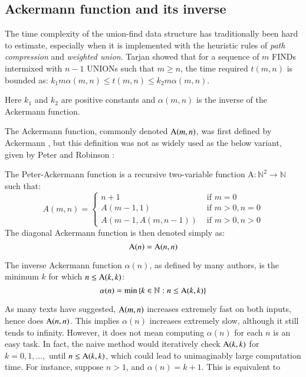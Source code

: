 \subsection{Ackermann function and its inverse}

The time complexity of the union-find data structure has traditionally
been hard to estimate, especially when it is implemented with the 
heuristic rules of \emph{path compression} and \emph{weighted union}. 
Tarjan \cite{tarjan} showed that for a sequence of $m$ FINDs intermixed with $n-1$ UNIONs 
such that $m \geq n$, the time required $t(m,n)$ is bounded
as: $k_{1}m\alpha(m,n) \leq t(m,n) \leq k_{2}m\alpha(m,n)$.

Here $k_{1}$ and $k_{2}$ are positive constants and $\alpha(m,n)$ is 
the inverse of the Ackermann function.

The Ackermann function, commonly denoted $\text{A}(m, n)$, was first defined by Ackermann \cite{ackermann}, but this definition was not as widely used as the below variant, given by Peter and Robinson \cite{peter-ackermann}:

\begin{defn} \label{defn: ack}
The Peter-Ackermann function is a recursive two-variable function $\text{A} : \mathbb{N}^2 \to \mathbb{N}$ such that:
\begin{equation}
A(m, n) = \begin{cases}
n + 1 & \text{ if } m = 0 \\
A(m-1, 1) & \text{ if } m > 0, n = 0 \\
A(m-1, A(m, n-1)) & \text{ if } m > 0, n > 0
\end{cases}
\end{equation}
The diagonal Ackermann function is then denoted simply as:
\begin{equation}
\text{A}(n) = \text{A}(n, n)
\end{equation}
\end{defn}


\begin{defn} \label{defn: inv_ack}
The inverse Ackermann function $\alpha(n)$, as defined by many authors, is the minimum $k$ for which $n \le \text{A}(k, k)$:
\begin{equation}
\alpha(n) = \min\left\{k\in \mathbb{N} : n \le \text{A}(k, k)\right\}
\end{equation}
\end{defn}

As many texts have suggested, $\text{A}(m, n)$ increases extremely fast on both inputs, hence does $\text{A}(n, n)$. This implies $\alpha(n)$ increases extremely slow, although it still tends to infinity. However, it does not mean computing $\alpha(n)$ for each $n$ is an easy task. In fact, the naive method would iteratively check $\text{A}(k, k)$ for $k = 0, 1, \ldots, $ until $n \le \text{A}(k, k)$, which could lead to unimaginably large computation time. For instance, suppose $n > 1$, and $\alpha(n) = k+1$. This is equivalent to

